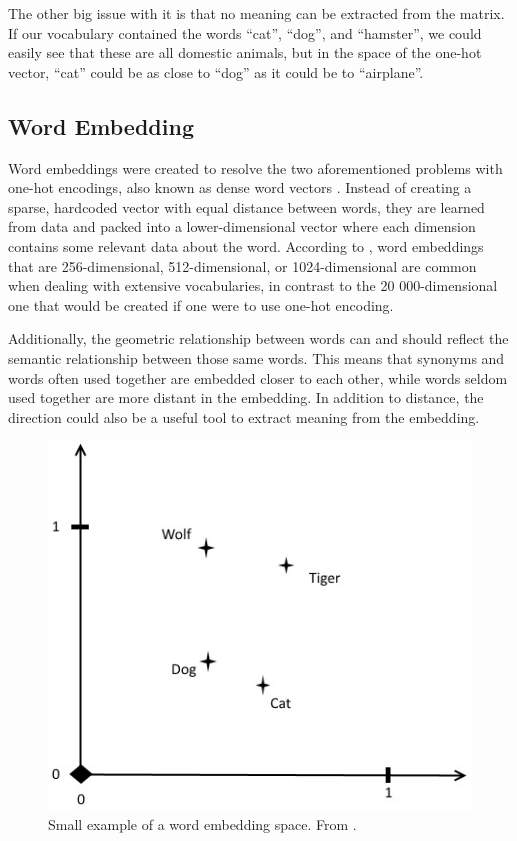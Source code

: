 \documentclass[nofilelist]{cslthse-msc}
\begin{document}
The other big issue with it is that no meaning can be extracted from the matrix. If our vocabulary contained the words ``cat'', ``dog'', and ``hamster'', we could easily see that these are all domestic animals, but in the space of the one-hot vector, ``cat'' could be as close to ``dog'' as it could be to ``airplane''. 

\subsection{Word Embedding}
Word embeddings were created to resolve the two aforementioned problems with one-hot encodings, also known as dense word vectors \citep{neuralnetworkmethods}. 
Instead of creating a sparse, hardcoded vector with equal distance between words, they are learned from data and packed into a lower-dimensional vector where each dimension contains some relevant data about the word. According to \citet{franoischollet2017learning}, word embeddings that are 256-dimensional, 512-dimensional, or 1024-dimensional are common when dealing with extensive vocabularies, in contrast to the 20 000-dimensional one that would be created if one were to use one-hot encoding. 

Additionally, the geometric relationship between words can and should reflect the semantic relationship between those same words. This means that synonyms and words often used together are embedded closer to each other, while words seldom used together are more distant in the embedding. In addition to distance, the direction could also be a useful tool to extract meaning from the embedding. %

\begin{figure}[!ht]
\centering
\includegraphics[scale=0.8]{msccls/explanatory_images/embedding_direction.png} 
\caption{Small example of a word embedding space. From \citet{franoischollet2017learning}.}
\label{fig:direction}
\end{figure}
\end{document}
